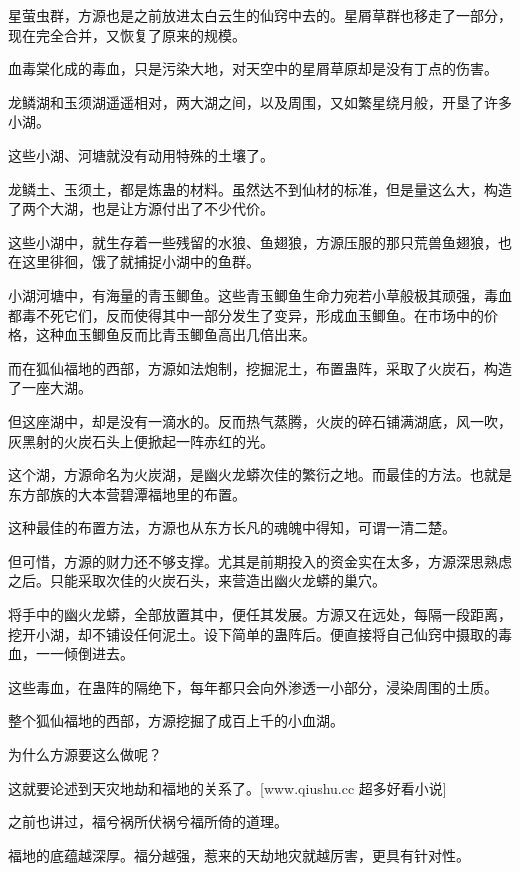 
\begin{this_body}

星萤虫群，方源也是之前放进太白云生的仙窍中去的。星屑草群也移走了一部分，现在完全合并，又恢复了原来的规模。

血毒棠化成的毒血，只是污染大地，对天空中的星屑草原却是没有丁点的伤害。

龙鳞湖和玉须湖遥遥相对，两大湖之间，以及周围，又如繁星绕月般，开垦了许多小湖。

这些小湖、河塘就没有动用特殊的土壤了。

龙鳞土、玉须土，都是炼蛊的材料。虽然达不到仙材的标准，但是量这么大，构造了两个大湖，也是让方源付出了不少代价。

这些小湖中，就生存着一些残留的水狼、鱼翅狼，方源压服的那只荒兽鱼翅狼，也在这里徘徊，饿了就捕捉小湖中的鱼群。

小湖河塘中，有海量的青玉鲫鱼。这些青玉鲫鱼生命力宛若小草般极其顽强，毒血都毒不死它们，反而使得其中一部分发生了变异，形成血玉鲫鱼。在市场中的价格，这种血玉鲫鱼反而比青玉鲫鱼高出几倍出来。

而在狐仙福地的西部，方源如法炮制，挖掘泥土，布置蛊阵，采取了火炭石，构造了一座大湖。

但这座湖中，却是没有一滴水的。反而热气蒸腾，火炭的碎石铺满湖底，风一吹，灰黑射的火炭石头上便掀起一阵赤红的光。

这个湖，方源命名为火炭湖，是幽火龙蟒次佳的繁衍之地。而最佳的方法。也就是东方部族的大本营碧潭福地里的布置。

这种最佳的布置方法，方源也从东方长凡的魂魄中得知，可谓一清二楚。

但可惜，方源的财力还不够支撑。尤其是前期投入的资金实在太多，方源深思熟虑之后。只能采取次佳的火炭石头，来营造出幽火龙蟒的巢穴。

将手中的幽火龙蟒，全部放置其中，便任其发展。方源又在远处，每隔一段距离，挖开小湖，却不铺设任何泥土。设下简单的蛊阵后。便直接将自己仙窍中摄取的毒血，一一倾倒进去。

这些毒血，在蛊阵的隔绝下，每年都只会向外渗透一小部分，浸染周围的土质。

整个狐仙福地的西部，方源挖掘了成百上千的小血湖。

为什么方源要这么做呢？

这就要论述到天灾地劫和福地的关系了。[www.qiushu.cc 超多好看小说]

之前也讲过，福兮祸所伏祸兮福所倚的道理。

福地的底蕴越深厚。福分越强，惹来的天劫地灾就越厉害，更具有针对性。


\end{this_body}
